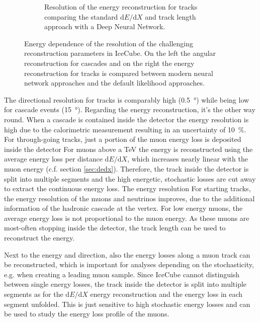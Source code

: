 \begin{figure}
\begin{subfigure}{0.43\textwidth}
        \caption{Resolution of the energy reconstruction for tracks comparing the standard $\mathrm{d}E/\mathrm{d}X$ and track length approach with a Deep Neural Network. \cite{Huennefeld17Master}}
        \label{fig:icecube_energy_resolution}
    \end{subfigure}
    \caption{Energy dependence of the resolution of the challenging reconstruction parameters in IceCube. On the left the angular reconstruction for cascades and on the right the energy reconstruction for tracks is compared between modern neural network approaches and the default likelihood approaches.}
    \label{fig:icecube_reco}
\end{figure}

The directional resolution for tracks is comparably high (\SI{0.5}{\degree}) while being low for cascade events (\SI{15}{\degree}).
Regarding the energy reconstruction, it's the other way round.
When a cascade is contained inside the detector the energy resolution is high due to the calorimetric measurement resulting in an uncertainty of \SI{10}{\%}.
For through-going tracks, just a portion of the muon energy loss is deposited inside the detector
For muons above a TeV the energy is reconstructed using the average energy loss per distance $\mathrm{d}E/\mathrm{d}X$, which increases nearly linear with the muon energy (c.f. section \ref{sec:dedx}).
Therefore, the track inside the detector is split into multiple segments and the high energetic, stochastic losses are cut away to extract the continuous energy loss.
The energy resolution 
For starting tracks, the energy resolution of the muons and neutrinos improves, due to the additional information of the hadronic cascade at the vertex.
For low energy muons, the average energy loss is not proportional to the muon energy.
As these muons are most-often stopping inside the detector, the track length can be used to reconstruct the energy.

Next to the energy and direction, also the energy losses along a muon track can be reconstructed, which is important for analyses depending on the stochasticity, e.g. when creating a leading muon sample.
Since IceCube cannot distinguish between single energy losses, the track inside the detector is split into multiple segments as for the $\mathrm{d}E/\mathrm{d}X$ energy reconstruction and the energy loss in each segment unfolded.
This is just sensitive to high stochastic energy losses and can be used to study the energy loss profile of the muons.


